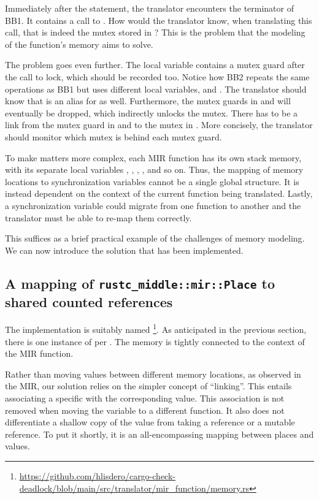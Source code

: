 Immediately after the statement, the translator encounters the terminator of BB1.
It contains a call to .
How would the translator know, when translating this call,
that  is indeed the mutex stored in ?
This is the problem that the modeling of the function's memory aims to solve.

The problem goes even further.
The local variable  contains a mutex guard after the call to lock,
which should be recorded too.
Notice how BB2 repeats the same operations as BB1 but uses different local variables,
 and .
The translator should know that  is an alias for  as well.
Furthermore, the mutex guards in  and  will eventually be dropped,
which indirectly unlocks the mutex.
There has to be a link from the mutex guard in  and 
to the mutex in .
More concisely, the translator should monitor which mutex is behind each mutex guard.

To make matters more complex, each \acrshort{MIR} function has its own stack memory,
with its separate local variables , ,
, , and so on.
Thus, the mapping of memory locations to synchronization variables
cannot be a single global structure.
It is instead dependent on the context of the current function being translated.
Lastly, a synchronization variable could migrate from one function to another
and the translator must be able to re-map them correctly.

This suffices as a brief practical example of the challenges of memory modeling.
We can now introduce the solution that has been implemented.

\subsection{A mapping of \texttt{rustc\_middle::mir::Place} to shared counted references}

The implementation is suitably named
\footnote{\url{https://github.com/hlisdero/cargo-check-deadlock/blob/main/src/translator/mir_function/memory.rs}}.
As anticipated in the previous section,
there is one instance of  per .
The memory is tightly connected to the context of the \acrshort{MIR} function.

Rather than moving values between different memory locations,
as observed in the \acrshort{MIR},
our solution relies on the simpler concept of ``linking''.
This entails associating a specific 
with the corresponding value.
This association is not removed when moving the variable to a different function.
It also does not differentiate a shallow copy of the value
from taking a reference or a mutable reference.
To put it shortly, it is an all-encompassing mapping between places and values.

